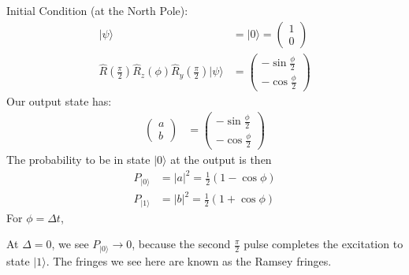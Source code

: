 \documentclass[lasers.tex]{subfiles}
\begin{document}
Initial Condition (at the North Pole):
\begin{align}
    |\psi\rangle &= |0\rangle = \begin{pmatrix} 1 \\ 0 \end{pmatrix} \\
    \hat{R}\left(\frac{\pi}{2}\right)\hat{R}_z(\phi)\hat{R}_y\left(\frac{\pi}{2}\right)|\psi\rangle &= \begin{pmatrix} -\sin\frac{\phi}{2} \\ -\cos\frac{\phi}{2}\end{pmatrix} 
\end{align}
Our output state has:
\begin{align}
    \begin{pmatrix} a \\ b \end{pmatrix} &= \begin{pmatrix} -\sin\frac{\phi}{2} \\ -\cos\frac{\phi}{2}\end{pmatrix} 
\end{align}
The probability to be in state $|0\rangle$ at the output is then
\begin{align}
    P_{|0\rangle} &= |a|^2 = \frac12(1-\cos\phi) \\
    P_{|1\rangle} &= |b|^2 = \frac12(1+\cos\phi)
\end{align}
For $\phi=\Delta t$,
\begin{figure}[H]
    \centering
\end{figure}

At $\Delta=0$, we see $P_{|0\rangle}\to0$, because the second $\frac{\pi}{2}$ pulse completes the excitation to state $|1\rangle$.
The fringes we see here are known as the Ramsey fringes.
\end{document}
